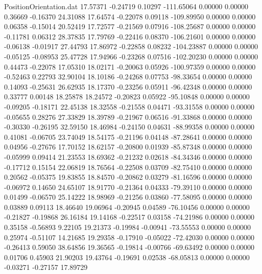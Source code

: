 \begin{filecontents}{PositionOrientation.dat}
  17.57371   -0.24719    0.10297  -111.65064    0.00000    0.00000    0.36669   -0.16370   24.31088
  17.64574   -0.22078    0.09118  -109.89950    0.00000    0.00000    0.06358   -0.15014   20.52419
  17.72577   -0.21569    0.07916  -108.25687    0.00000    0.00000   -0.11781    0.06312   28.37835
  17.79769   -0.22416    0.08370  -106.21601    0.00000    0.00000   -0.06138   -0.01917   27.44793
  17.86972   -0.22858    0.08232  -104.23887    0.00000    0.00000   -0.05125   -0.08953   25.47728
  17.94966   -0.23268    0.07516  -102.20230    0.00000    0.00000    0.44473   -0.22078   17.05310
  18.02171   -0.20063    0.05926  -100.97359    0.00000    0.00000   -0.52463    0.22793   32.90104
  18.10186   -0.24268    0.07753   -98.33654    0.00000    0.00000    0.14093   -0.25631   26.62935
  18.17370   -0.23256    0.05911   -96.42348    0.00000    0.00000    0.33777    0.00148   18.25878
  18.24572   -0.20823    0.05922   -95.10848    0.00000    0.00000   -0.09205   -0.18171   22.45138
  18.32558   -0.21558    0.04471   -93.31558    0.00000    0.00000   -0.05655    0.28276   27.33829
  18.39789   -0.21967    0.06516   -91.33868    0.00000    0.00000   -0.30330   -0.26195   32.59150
  18.46984   -0.24150    0.04631   -88.99358    0.00000    0.00000    0.41081   -0.06705   23.74049
  18.54175   -0.21196    0.04148   -87.28641    0.00000    0.00000    0.04956   -0.27676   17.70152
  18.62157   -0.20800    0.01939   -85.87348    0.00000    0.00000   -0.05999    0.09414   21.23553
  18.69362   -0.21232    0.02618   -84.34346    0.00000    0.00000   -0.17712    0.15154   22.06819
  18.76564   -0.22508    0.03709   -82.75410    0.00000    0.00000    0.20562   -0.05375   19.83855
  18.84570   -0.20862    0.03279   -81.16596    0.00000    0.00000   -0.06972    0.14650   24.65107
  18.91770   -0.21364    0.04333   -79.39110    0.00000    0.00000    0.01499   -0.06570   25.14222
  18.98969   -0.21256    0.03860   -77.58095    0.00000    0.00000    0.03889    0.09113   18.46640
  19.06964   -0.20945    0.04589   -76.10456    0.00000    0.00000   -0.21827   -0.19868   26.16184
  19.14168   -0.22517    0.03158   -74.21986    0.00000    0.00000    0.35158   -0.56893    9.22105
  19.21373   -0.19984   -0.00941   -73.55553    0.00000    0.00000    0.25974   -0.51107   14.21685
  19.29358   -0.17910   -0.05022   -72.42030    0.00000    0.00000   -0.26413    0.59050   38.64856
  19.36565   -0.19814   -0.00766   -69.63492    0.00000    0.00000    0.01706    0.45903   21.90203
  19.43764   -0.19691    0.02538   -68.05813    0.00000    0.00000   -0.03271   -0.27157   17.89729

\end{filecontents}
